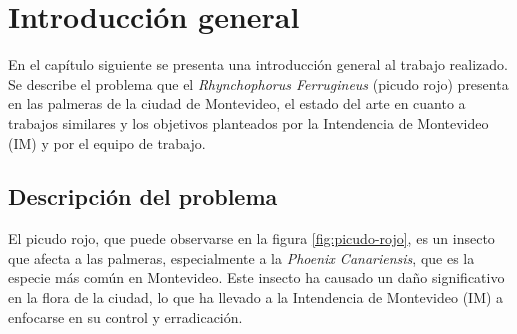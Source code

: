 
\chapter{Introducción general} %

\label{Chapter1} %
\label{IntroGeneral}

En el capítulo siguiente se presenta una introducción general al trabajo realizado. Se describe el problema que el \textit{Rhynchophorus Ferrugineus} (picudo rojo) presenta en las palmeras de la ciudad de Montevideo, el estado del arte en cuanto a trabajos similares y los objetivos planteados por la Intendencia de Montevideo (IM) y por el equipo de trabajo.


\newcommand{\keyword}[1]{\textbf{#1}}
\newcommand{\tabhead}[1]{\textbf{#1}}
\newcommand{\code}[1]{\texttt{#1}}
\newcommand{\file}[1]{\texttt{\bfseries#1}}
\newcommand{\option}[1]{\texttt{\itshape#1}}
\newcommand{\grados}{$^{\circ}$}
\newcommand{\comment}[1]{}

\section{Descripción del problema}
\label{sec:descProblema}

El picudo rojo, que puede observarse en la figura \ref{fig:picudo-rojo}, \comment{TODO: Poner referencia al picudo rojo} es un insecto que afecta a las palmeras, especialmente a la \textit{Phoenix Canariensis}, que es la especie más común en Montevideo. Este insecto ha causado un daño significativo en la flora de la ciudad, lo que ha llevado a la Intendencia de Montevideo (IM) a enfocarse en su control y erradicación. 

